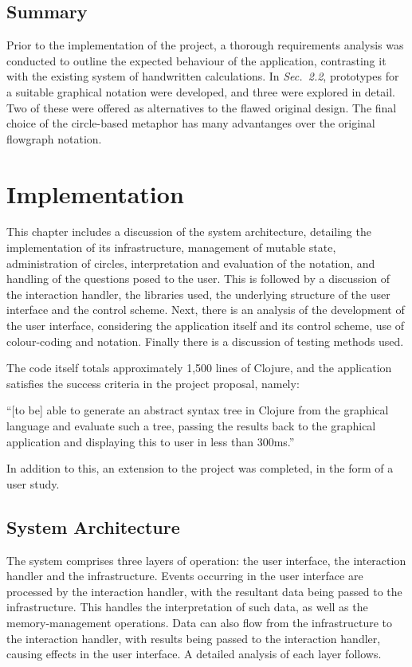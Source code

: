\documentclass[12pt,twoside,notitlepage,xetex]{report}
\begin{document}
\section{Summary}

Prior to the implementation of the project, a thorough requirements analysis was conducted to outline the expected behaviour of the application, contrasting it with the existing system of handwritten calculations.  In \emph{Sec.~2.2}, prototypes for a suitable graphical notation were developed, and three were explored in detail.  Two of these were offered as alternatives to the flawed original design.  The final choice of the circle-based metaphor has many advantanges over the original flowgraph notation.

\cleardoublepage
\chapter{Implementation}

This chapter includes a discussion of the system architecture, detailing the implementation of its infrastructure, management of mutable state, administration of circles, interpretation and evaluation of the notation, and handling of the questions posed to the user.  This is followed by a discussion of the interaction handler, the libraries used, the underlying structure of the user interface and the control scheme.  Next, there is an analysis of the development of the user interface, considering the application itself and its control scheme, use of colour-coding and notation.  Finally there is a discussion of testing methods used.

The code itself totals approximately 1,500 lines of Clojure, and the application satisfies the success criteria in the project proposal, namely:
\begin{center}
\parbox[c]{\textwidth-2cm}{
\small
``[to be] able to generate an abstract syntax tree in Clojure from the graphical language and evaluate such a tree, passing the results back to the graphical application and displaying this to user in less than 300ms.''
}
\end{center}
In addition to this, an extension to the project was completed, in the form of a user study.

\section{System Architecture}

The system comprises three layers of operation: the user interface, the interaction handler and the infrastructure.  Events occurring in the user interface are processed by the interaction handler, with the resultant data being passed to the infrastructure.  This handles the interpretation of such data, as well as the memory-management operations.  Data can also flow from the infrastructure to the interaction handler, with results being passed to the interaction handler, causing effects in the user interface.  A detailed analysis of each layer follows.
\end{document}
